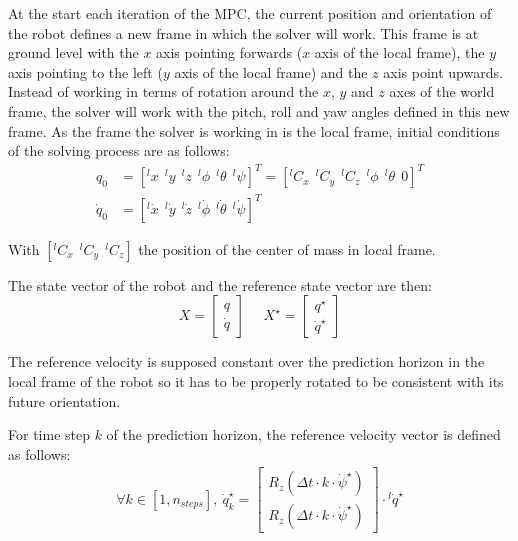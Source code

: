 \documentclass[a4paper,11pt]{article}
\begin{document}
At the start each iteration of the MPC, the current position and orientation of the robot defines a new frame in which the solver will work. This frame is at ground level with the $x$ axis pointing forwards ($x$ axis of the local frame), the $y$ axis pointing to the left ($y$ axis of the local frame) and the $z$ axis point upwards. Instead of working in terms of rotation around the $x$, $y$ and $z$ axes of the world frame, the solver will work with the pitch, roll and yaw angles defined in this new frame. As the frame the solver is working in is the local frame, initial conditions of the solving process are as follows:
\begin{align}
q_0 &= [{}^l\!x ~~ {}^l\!y ~~ {}^l\!z ~~ {}^l\! \phi ~~ {}^l\! \theta ~~ {}^l\! \psi ]^T = [ {}^l\!C_x ~~ {}^l\!C_y ~~ {}^l\!C_z ~~ {}^l\! \phi ~~ {}^l\! \theta ~~ 0]^T \\
\dot q_0 &= [{}^l\! \dot x ~~ {}^l\! \dot y ~~ {}^l\! \dot z ~~ {}^l\! \dot \phi ~~ {}^l\! \dot \theta ~~ {}^l\! \dot \psi ]^T
\end{align}

With $[{}^l\! C_x ~~ {}^l\! C_y ~~ {}^l\! C_z ]$ the position of the center of mass in local frame.

The state vector of the robot and the reference state vector are then: 
\begin{equation}X = \begin{bmatrix} q \\ \dot q \end{bmatrix} \text{~~~~}X^\star = \begin{bmatrix} q^{\star} \\ \dot q^{\star} \end{bmatrix}\end{equation}

The reference velocity is supposed constant over the prediction horizon in the local frame of the robot so it has to be properly rotated to be consistent with its future orientation.

For time step $k$ of the prediction horizon, the reference velocity vector is defined as follows:
\begin{align}
\forall k \in [1, n_{steps}], ~ \dot q_k^\star = \begin{bmatrix} R_z(\Delta t \cdot k \cdot \dot \psi^\star) \\ R_z(\Delta t \cdot k \cdot \dot \psi^\star) \end{bmatrix} \cdot {}^l\! \dot q^\star
\end{align}
\end{document}
